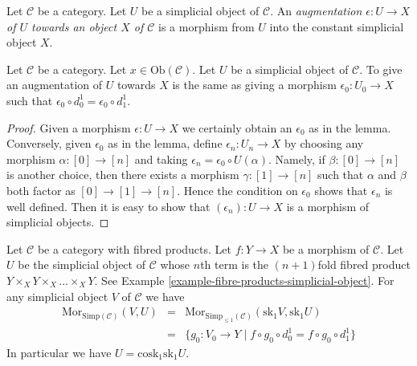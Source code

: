 \begin{definition}
\label{definition-augmentation}
Let $\mathcal{C}$ be a category.
Let $U$ be a simplicial object of $\mathcal{C}$.
An {\it augmentation $\epsilon : U \to X$ of
$U$ towards an object $X$ of $\mathcal{C}$}
is a morphism from $U$ into the constant simplicial
object $X$.
\end{definition}

\begin{lemma}
\label{lemma-augmentation-howto}
Let $\mathcal{C}$ be a category.
Let $x \in \text{Ob}(\mathcal{C})$.
Let $U$ be a simplicial object of $\mathcal{C}$.
To give an augmentation of $U$ towards $X$ is
the same as giving a morphism $\epsilon_0 : U_0 \to X$
such that $\epsilon_0 \circ d^1_0 = \epsilon_0 \circ d^1_1$.
\end{lemma}

\begin{proof}
Given a morphism $\epsilon : U \to X$
we certainly obtain an $\epsilon_0$ as in the lemma.
Conversely, given $\epsilon_0$ as in the lemma, define
$\epsilon_n : U_n \to X$ by choosing any
morphism $\alpha : [0] \to [n]$ and taking
$\epsilon_n = \epsilon_0 \circ U(\alpha)$.
Namely, if $\beta : [0] \to [n]$ is another
choice, then there exists a morphism
$\gamma : [1] \to [n]$ such that $\alpha$
and $\beta$ both factor as $[0] \to [1] \to [n]$.
Hence the condition on $\epsilon_0$ shows that
$\epsilon_n$ is well defined. Then it is
easy to show that $(\epsilon_n) : U \to X$
is a morphism of simplicial objects.
\end{proof}

\begin{lemma}
\label{lemma-cosk-minus-one}
Let $\mathcal{C}$ be a category with fibred products.
Let $f : Y\to X$ be a morphism of $\mathcal{C}$. Let $U$ be the
simplicial object of $\mathcal{C}$ whose $n$th term
is the $(n + 1)$fold fibred product
$Y\times_X Y \times_X \ldots \times_X Y$.
See Example \ref{example-fibre-products-simplicial-object}.
For any simplicial object $V$ of $\mathcal{C}$ we have
\begin{eqnarray*}
\text{Mor}_{\text{Simp}(\mathcal{C})}(V, U)
& = &
\text{Mor}_{\text{Simp}_{\leq 1}(\mathcal{C})}(\text{sk}_1 V, \text{sk}_1 U) \\
& = &\{
g_0 : V_0 \to Y \mid
f \circ g_0 \circ d^1_0 = f \circ g_0 \circ d^1_1
\}
\end{eqnarray*}
In particular we have $U = \text{cosk}_1 \text{sk}_1 U$.
\end{lemma}

